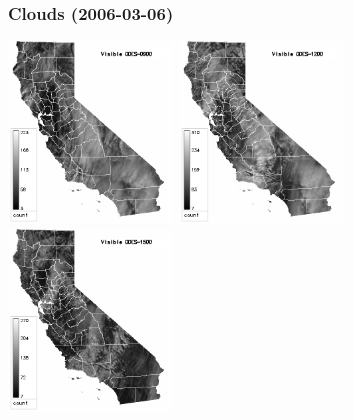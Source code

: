 \documentclass{beamer}
\begin{document}
\begin{frame}
  \frametitle{Clouds (2006-03-06)}

  \includegraphics[width=0.33\textwidth]{2006-03-06/vis0900.png}
  \includegraphics[width=0.33\textwidth]{2006-03-06/vis1200.png}
  \includegraphics[width=0.33\textwidth]{2006-03-06/vis1500.png}


\end{frame}
\end{document}
